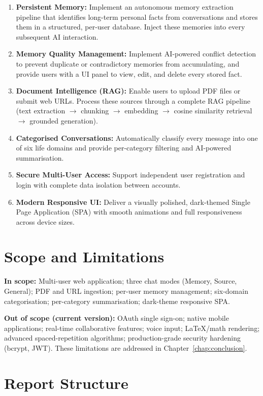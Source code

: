 \documentclass[12pt,a4paper]{report}
\begin{document}
\begin{enumerate}
  \item \textbf{Persistent Memory:} Implement an autonomous memory extraction pipeline that identifies long-term personal facts from conversations and stores them in a structured, per-user database. Inject these memories into every subsequent AI interaction.
  \item \textbf{Memory Quality Management:} Implement AI-powered conflict detection to prevent duplicate or contradictory memories from accumulating, and provide users with a UI panel to view, edit, and delete every stored fact.
  \item \textbf{Document Intelligence (RAG):} Enable users to upload PDF files or submit web URLs. Process these sources through a complete RAG pipeline (text extraction $\rightarrow$ chunking $\rightarrow$ embedding $\rightarrow$ cosine similarity retrieval $\rightarrow$ grounded generation).
  \item \textbf{Categorised Conversations:} Automatically classify every message into one of six life domains and provide per-category filtering and AI-powered summarisation.
  \item \textbf{Secure Multi-User Access:} Support independent user registration and login with complete data isolation between accounts.
  \item \textbf{Modern Responsive UI:} Deliver a visually polished, dark-themed Single Page Application (SPA) with smooth animations and full responsiveness across device sizes.
\end{enumerate}

\section{Scope and Limitations}

\textbf{In scope:} Multi-user web application; three chat modes (Memory, Source, General); PDF and URL ingestion; per-user memory management; six-domain categorisation; per-category summarisation; dark-theme responsive SPA.

\textbf{Out of scope (current version):} OAuth single sign-on; native mobile applications; real-time collaborative features; voice input; LaTeX/math rendering; advanced spaced-repetition algorithms; production-grade security hardening (bcrypt, JWT). These limitations are addressed in Chapter~\ref{chap:conclusion}.

\section{Report Structure}
\end{document}
